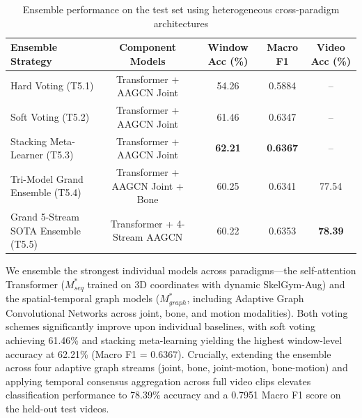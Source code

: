 \documentclass[runningheads]{llncs}
\begin{document}
\begin{table}[!h]
\centering
\caption{Ensemble performance on the test set using heterogeneous cross-paradigm architectures}
\label{tab:ensemble-results}
\begin{tabular}{l c c c c}
\hline
\textbf{Ensemble Strategy} & \textbf{Component Models} & \textbf{Window Acc (\%)} & \textbf{Macro F1} & \textbf{Video Acc (\%)} \\
\hline
Hard Voting (T5.1)                  & Transformer + AAGCN Joint & 54.26 & 0.5884 & -- \\
Soft Voting (T5.2)                  & Transformer + AAGCN Joint & 61.46 & 0.6347 & -- \\
Stacking Meta-Learner (T5.3)        & Transformer + AAGCN Joint & \textbf{62.21} & \textbf{0.6367} & -- \\
Tri-Model Grand Ensemble (T5.4)     & Transformer + AAGCN Joint + Bone & 60.25 & 0.6341 & 77.54 \\
Grand 5-Stream SOTA Ensemble (T5.5) & Transformer + 4-Stream AAGCN & 60.22 & 0.6353 & \textbf{78.39} \\
\hline
\end{tabular}
\end{table}

We ensemble the strongest individual models across paradigms—the self-attention Transformer ($M_{seq}^*$ trained on 3D coordinates with dynamic SkelGym-Aug) and the spatial-temporal graph models ($M_{graph}^*$, including Adaptive Graph Convolutional Networks across joint, bone, and motion modalities). Both voting schemes significantly improve upon individual baselines, with soft voting achieving 61.46\% and stacking meta-learning yielding the highest window-level accuracy at 62.21\% (Macro F1 = 0.6367). Crucially, extending the ensemble across four adaptive graph streams (joint, bone, joint-motion, bone-motion) and applying temporal consensus aggregation across full video clips elevates classification performance to 78.39\% accuracy and a 0.7951 Macro F1 score on the held-out test videos.
\end{document}
